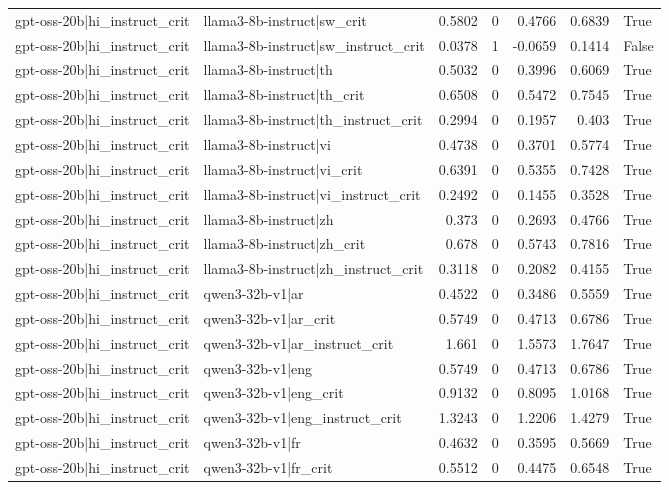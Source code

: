 \begin{table}
\begin{tabular}{l l r r r r l}
gpt-oss-20b|hi_instruct_crit & llama3-8b-instruct|sw_crit & 0.5802 & 0 & 0.4766 & 0.6839 & True \\
gpt-oss-20b|hi_instruct_crit & llama3-8b-instruct|sw_instruct_crit & 0.0378 & 1 & -0.0659 & 0.1414 & False \\
gpt-oss-20b|hi_instruct_crit & llama3-8b-instruct|th & 0.5032 & 0 & 0.3996 & 0.6069 & True \\
gpt-oss-20b|hi_instruct_crit & llama3-8b-instruct|th_crit & 0.6508 & 0 & 0.5472 & 0.7545 & True \\
gpt-oss-20b|hi_instruct_crit & llama3-8b-instruct|th_instruct_crit & 0.2994 & 0 & 0.1957 & 0.403 & True \\
gpt-oss-20b|hi_instruct_crit & llama3-8b-instruct|vi & 0.4738 & 0 & 0.3701 & 0.5774 & True \\
gpt-oss-20b|hi_instruct_crit & llama3-8b-instruct|vi_crit & 0.6391 & 0 & 0.5355 & 0.7428 & True \\
gpt-oss-20b|hi_instruct_crit & llama3-8b-instruct|vi_instruct_crit & 0.2492 & 0 & 0.1455 & 0.3528 & True \\
gpt-oss-20b|hi_instruct_crit & llama3-8b-instruct|zh & 0.373 & 0 & 0.2693 & 0.4766 & True \\
gpt-oss-20b|hi_instruct_crit & llama3-8b-instruct|zh_crit & 0.678 & 0 & 0.5743 & 0.7816 & True \\
gpt-oss-20b|hi_instruct_crit & llama3-8b-instruct|zh_instruct_crit & 0.3118 & 0 & 0.2082 & 0.4155 & True \\
gpt-oss-20b|hi_instruct_crit & qwen3-32b-v1|ar & 0.4522 & 0 & 0.3486 & 0.5559 & True \\
gpt-oss-20b|hi_instruct_crit & qwen3-32b-v1|ar_crit & 0.5749 & 0 & 0.4713 & 0.6786 & True \\
gpt-oss-20b|hi_instruct_crit & qwen3-32b-v1|ar_instruct_crit & 1.661 & 0 & 1.5573 & 1.7647 & True \\
gpt-oss-20b|hi_instruct_crit & qwen3-32b-v1|eng & 0.5749 & 0 & 0.4713 & 0.6786 & True \\
gpt-oss-20b|hi_instruct_crit & qwen3-32b-v1|eng_crit & 0.9132 & 0 & 0.8095 & 1.0168 & True \\
gpt-oss-20b|hi_instruct_crit & qwen3-32b-v1|eng_instruct_crit & 1.3243 & 0 & 1.2206 & 1.4279 & True \\
gpt-oss-20b|hi_instruct_crit & qwen3-32b-v1|fr & 0.4632 & 0 & 0.3595 & 0.5669 & True \\
gpt-oss-20b|hi_instruct_crit & qwen3-32b-v1|fr_crit & 0.5512 & 0 & 0.4475 & 0.6548 & True \\

\end{tabular}
\end{table}
